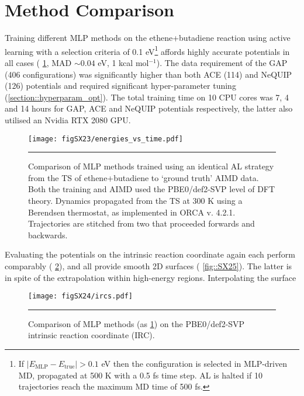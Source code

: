 \documentclass[11pt]{article}
\numberwithin{equation}{subsection}
\newcommand{\kcal}{kcal mol$^{-1}$}
\begin{document}
\clearpage
\section{Method Comparison}


Training different MLP methods on the ethene+butadiene reaction using active learning with a selection criteria of 0.1 eV\footnote{If $|E_\text{MLP} - E_\text{true}| > 0.1$ eV then the configuration is selected in MLP-driven MD, propagated at 500 K with a 0.5 fs time step. AL is halted if 10 trajectories reach the maximum MD time of 500 fs.} affords highly accurate potentials in all cases (\figurename{ \ref{fig::SX23}}, MAD $\sim 0.04$ eV, 1 \kcal). The data requirement of the GAP (406 configurations) was significantly higher than both ACE (114) and NeQUIP (126) potentials and required significant hyper-parameter tuning (\ref{section::hyperparam_opt}). The total training time on 10 CPU cores was 7, 4 and 14 hours for GAP, ACE and NeQUIP potentials respectively, the latter also utilised an Nvidia RTX 2080 GPU.


\begin{figure}[h!]
	\centering
	\texttt{[image: figSX23/energies\_vs\_time.pdf]}
	\vspace{0.0cm}
	\hrule
	\vspace{0.1cm}
	\caption{Comparison of MLP methods trained using an identical AL strategy from the TS of ethene+butadiene to `ground truth' AIMD data. Both the training and AIMD used the PBE0/def2-SVP level of DFT theory. Dynamics propagated from the TS at 300 K using a Berendsen thermostat, as implemented in ORCA v. 4.2.1. Trajectories are stitched from two that proceeded forwards and backwards.}
	\label{fig::SX23}
\end{figure}


Evaluating the potentials on the intrinsic reaction coordinate again each perform comparably (\figurename{ \ref{fig::SX24}}), and all provide smooth 2D surfaces (\figurename{ \ref{fig::SX25}}). The latter is in spite of the extrapolation within high-energy regions. Interpolating the surface 


\begin{figure}[h!]
	\centering
	\texttt{[image: figSX24/ircs.pdf]}
	\vspace{0.0cm}
	\hrule
	\vspace{0.1cm}
	\caption{Comparison of MLP methods (as \figurename{ \ref{fig::SX23}}) on the PBE0/def2-SVP intrinsic reaction coordinate (IRC).}
	\label{fig::SX24}
\end{figure}
\end{document}
